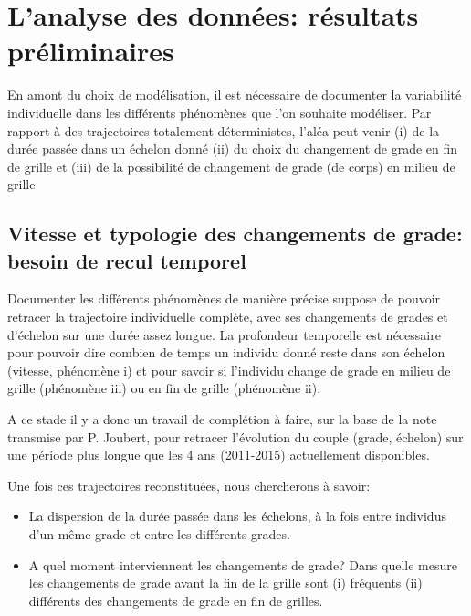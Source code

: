 \documentclass[11pt,a4paper]{article}
\begin{document}
\else \fi



\section{L'analyse des données: résultats préliminaires}

En amont du choix de modélisation, il est nécessaire de documenter la variabilité individuelle dans les différents phénomènes que l'on souhaite modéliser. Par rapport à des trajectoires totalement déterministes, l'aléa peut venir (i) de la durée passée dans un échelon donné (ii) du choix du changement de grade en fin de grille et (iii) de la possibilité de changement de grade (de corps) en milieu de grille 

\subsection{Vitesse et typologie des changements de grade: besoin de recul temporel}

Documenter les différents phénomènes de manière précise suppose de pouvoir retracer la trajectoire individuelle complète, avec ses changements de grades et d'échelon sur une durée assez longue. La profondeur temporelle est nécessaire pour pouvoir dire combien de temps un individu donné reste dans son échelon (vitesse, phénomène i) et pour savoir si l'individu change de grade en milieu de grille (phénomène iii) ou en fin de grille (phénomène ii). 

A ce stade il y a donc un travail de complétion à faire, sur la base de la note transmise par P. Joubert, pour retracer l'évolution du couple (grade, échelon) sur une période plus longue que les 4 ans (2011-2015) actuellement disponibles. 

Une fois ces trajectoires reconstituées, nous chercherons à savoir: 
\begin{itemize}[leftmargin=1cm ,parsep=0cm,itemsep=0cm,topsep=0cm] 
\item La dispersion de la durée passée dans les échelons, à la fois entre individus d'un même grade et entre les différents grades. 
\item A quel moment interviennent les changements de grade? Dans quelle mesure les changements de grade avant la fin de la grille sont (i) fréquents (ii) différents des changements de grade en fin de grilles. 
\end{itemize}
\end{document}
